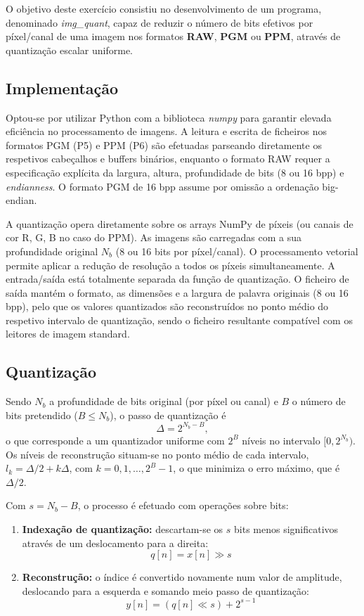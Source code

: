 \documentclass[11pt,a4paper]{report}
\begin{document}
O objetivo deste exercício consistiu no desenvolvimento de um programa, denominado \emph{img\_quant}, capaz de reduzir o número de bits efetivos por píxel/canal de uma imagem nos formatos \textbf{RAW}, \textbf{PGM} ou \textbf{PPM}, através de quantização escalar uniforme.

\subsection{Implementação}

Optou-se por utilizar Python com a biblioteca \emph{numpy} para garantir elevada eficiência no processamento de imagens. A leitura e escrita de ficheiros nos formatos PGM (P5) e PPM (P6) são efetuadas parseando diretamente os respetivos cabeçalhos e buffers binários, enquanto o formato RAW requer a especificação explícita da largura, altura, profundidade de bits (8 ou 16 bpp) e \emph{endianness}. O formato PGM de 16 bpp assume por omissão a ordenação big-endian. 

A quantização opera diretamente sobre os arrays NumPy de píxeis (ou canais de cor R, G, B no caso do PPM). As imagens são carregadas com a sua profundidade original $N_b$ (8 ou 16 bits por píxel/canal). O processamento vetorial permite aplicar a redução de resolução a todos os píxeis simultaneamente. A entrada/saída está totalmente separada da função de quantização. O ficheiro de saída mantém o formato, as dimensões e a largura de palavra originais (8 ou 16 bpp), pelo que os valores quantizados são reconstruídos no ponto médio do respetivo intervalo de quantização, sendo o ficheiro resultante compatível com os leitores de imagem standard.

\subsection{Quantização}

Sendo $N_b$ a profundidade de bits original (por píxel ou canal) e $B$ o número de bits pretendido ($B \le N_b$), o passo de quantização é
$$\Delta = 2^{N_b - B},$$
o que corresponde a um quantizador uniforme com $2^B$ níveis no intervalo $[0, 2^{N_b})$. Os níveis de reconstrução situam-se no ponto médio de cada intervalo, $l_k = \Delta/2 + k\Delta$, com $k = 0, 1, \ldots, 2^B - 1$, o que minimiza o erro máximo, que é $\Delta/2$.

Com $s = N_b - B$, o processo é efetuado com operações sobre bits:

\begin{enumerate}
\item \textbf{Indexação de quantização:}
descartam-se os $s$ bits menos significativos através de um deslocamento para a direita:
$$q[n] = x[n] \gg s$$
\item \textbf{Reconstrução:}
o índice é convertido novamente num valor de amplitude, deslocando para a esquerda e somando meio passo de quantização:
$$y[n] = (q[n] \ll s) + 2^{s-1}$$
\end{enumerate}
\end{document}
